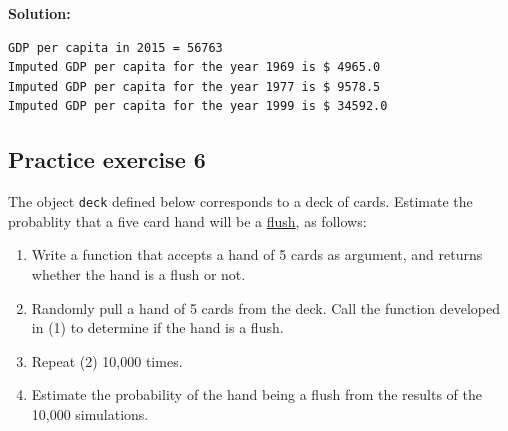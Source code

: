 \documentclass[
  letterpaper,
  DIV=11,
  numbers=noendperiod]{scrreprt}
\newenvironment{Shaded}{\begin{snugshade}}{\end{snugshade}}
\newcommand{\BuiltInTok}[1]{\textcolor[rgb]{0.00,0.23,0.31}{#1}}
\newcommand{\CommentTok}[1]{\textcolor[rgb]{0.37,0.37,0.37}{#1}}
\newcommand{\ControlFlowTok}[1]{\textcolor[rgb]{0.00,0.23,0.31}{#1}}
\newcommand{\DecValTok}[1]{\textcolor[rgb]{0.68,0.00,0.00}{#1}}
\newcommand{\KeywordTok}[1]{\textcolor[rgb]{0.00,0.23,0.31}{#1}}
\newcommand{\NormalTok}[1]{\textcolor[rgb]{0.00,0.23,0.31}{#1}}
\newcommand{\OperatorTok}[1]{\textcolor[rgb]{0.37,0.37,0.37}{#1}}
\newcommand{\StringTok}[1]{\textcolor[rgb]{0.13,0.47,0.30}{#1}}
\providecommand{\tightlist}{%
  \setlength{\itemsep}{0pt}\setlength{\parskip}{0pt}}\usepackage{longtable,booktabs,array}
\begin{document}
\textbf{Solution:}

\begin{Shaded}
\end{Shaded}

\begin{verbatim}
GDP per capita in 2015 = 56763
Imputed GDP per capita for the year 1969 is $ 4965.0
Imputed GDP per capita for the year 1977 is $ 9578.5
Imputed GDP per capita for the year 1999 is $ 34592.0
\end{verbatim}

\hypertarget{practice-exercise-6-2}{%
\subsection{Practice exercise 6}\label{practice-exercise-6-2}}

The object \texttt{deck} defined below corresponds to a deck of cards.
Estimate the probablity that a five card hand will be a
\href{https://en.wikipedia.org/wiki/Flush_(cards)}{flush}, as follows:

\begin{enumerate}
\def\labelenumi{\arabic{enumi}.}
\tightlist
\item
  Write a function that accepts a hand of 5 cards as argument, and
  returns whether the hand is a flush or not.
\item
  Randomly pull a hand of 5 cards from the deck. Call the function
  developed in (1) to determine if the hand is a flush.
\item
  Repeat (2) 10,000 times.
\item
  Estimate the probability of the hand being a flush from the results of
  the 10,000 simulations.
\end{enumerate}
\end{document}
